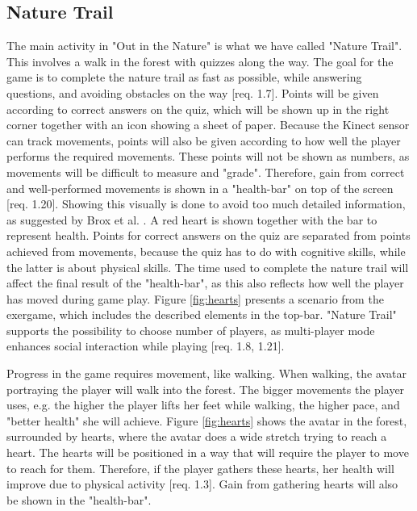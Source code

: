 \subsection{Nature Trail}
The main activity in "Out in the Nature" is what we have called "Nature Trail". This involves a walk in the forest with quizzes along the way. The goal for the game is to complete the nature trail as fast as possible, while answering questions, and avoiding obstacles on the way [req. 1.7]. Points will be given according to correct answers on the quiz, which will be shown up in the right corner together with an icon showing a sheet of paper. Because the Kinect sensor can track movements, points will also be given according to how well the player performs the required movements. These points will not be shown as numbers, as movements will be difficult to measure and "grade". Therefore, gain from correct and well-performed movements is shown in a "health-bar" on top of the screen [req. 1.20]. Showing this visually is done to avoid too much detailed information, as suggested by Brox et al. \cite{exergamesforelderly}. A red heart is shown together with the bar to represent health. Points for correct answers on the quiz are separated from points achieved from movements, because the quiz has to do with cognitive skills, while the latter is about physical skills. The time used to complete the nature trail will affect the final result of the "health-bar", as this also reflects how well the player has moved during game play. Figure \ref{fig:hearts} presents a scenario from the exergame, which includes the described elements in the top-bar. "Nature Trail" supports the possibility to choose number of players, as multi-player mode enhances social interaction while playing [req. 1.8, 1.21].  

Progress in the game requires movement, like walking. When walking, the avatar portraying the player will walk into the forest. The bigger movements the player uses, e.g. the higher the player lifts her feet while walking, the higher pace, and "better health" she will achieve. Figure \ref{fig:hearts} shows the avatar in the forest, surrounded by hearts, where the avatar does a wide stretch trying to reach a heart. The hearts will be positioned in a way that will require the player to move to reach for them. Therefore, if the player gathers these hearts, her health will improve due to physical activity [req. 1.3]. Gain from gathering hearts will also be shown in the "health-bar".   

